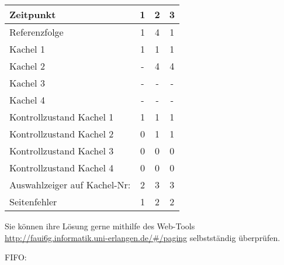 \begin{enumerate}[a)]
\begin{normalText}
\begin{minipage}{.45\textwidth}
		\vspace{.25cm}

		\begin{tabular}{|p{4.3cm}||c|c|c|}
			\hline
			\rowcolor{gray} Zeitpunkt & 1 & 2 & 3 \\
			\hline
			\rowcolor{gray} Referenzfolge & 1 & 4 & 1 \\
			\hline \hline
			Kachel 1 & 1 & 1 & 1 \\
			\hline
			Kachel 2 & - & 4 & 4 \\
			\hline
			Kachel 3 & - & - & - \\
			\hline
			Kachel 4 & - & - & - \\
			\hline \hline
			\rowcolor{lightgray}Kontrollzustand Kachel 1 & 1 & 1 & 1 \\
			\hline
			\rowcolor{lightgray}Kontrollzustand Kachel 2 & 0 & 1 & 1 \\
			\hline
			\rowcolor{lightgray}Kontrollzustand Kachel 3 & 0 & 0 & 0 \\
			\hline
			\rowcolor{lightgray}Kontrollzustand Kachel 4 & 0 & 0 & 0 \\
			\hline
			\rowcolor{lightgray} \raggedright Auswahlzeiger auf Kachel-Nr: & 2 & 3 & 3 \\
			\hline\hline
			\rowcolor{gray} Seitenfehler & 1 & 2 & 2 \\
			\hline
		\end{tabular}
	\end{minipage}
\end{normalText}

\cprotEnv
\begin{solution}
Sie können ihre Lösung gerne mithilfe des Web-Tools \url{http://faui6g.informatik.uni-erlangen.de/#/paging} selbstständig überprüfen.
\end{solution}

\cprotEnv
\begin{note}
FIFO:\nopagebreak


\end{note}
\end{enumerate}
